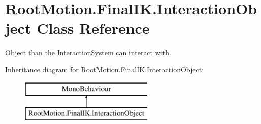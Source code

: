 \hypertarget{class_root_motion_1_1_final_i_k_1_1_interaction_object}{}\section{Root\+Motion.\+Final\+I\+K.\+Interaction\+Object Class Reference}
\label{class_root_motion_1_1_final_i_k_1_1_interaction_object}


Object than the \mbox{\hyperlink{class_root_motion_1_1_final_i_k_1_1_interaction_system}{Interaction\+System}} can interact with.  


Inheritance diagram for Root\+Motion.\+Final\+I\+K.\+Interaction\+Object\+:\begin{figure}[H]
\begin{center}
\leavevmode
\includegraphics[height=2.000000cm]{class_root_motion_1_1_final_i_k_1_1_interaction_object}
\end{center}
\end{figure}
